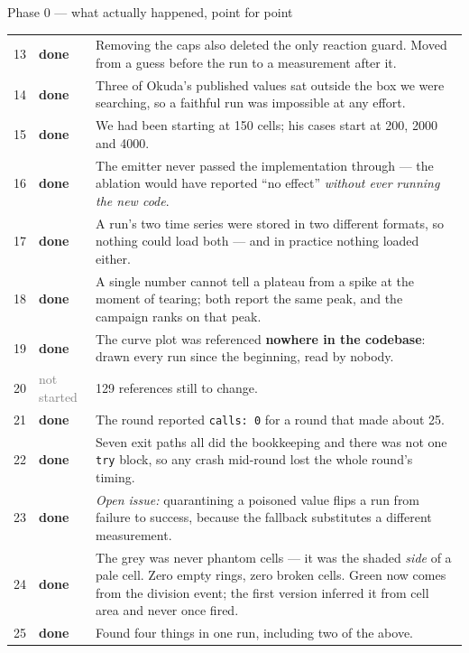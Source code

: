 \documentclass[11pt,a4paper]{article}
\newcommand{\code}[1]{\texttt{#1}}
\newcommand{\dn}{\textcolor{good}{\textbf{done}}}
\newcommand{\ns}{\textcolor{grey}{not started}}
\begin{document}
\begin{phasebox}{Phase 0 --- what actually happened, point for point}
\begin{tabular}{@{}r@{.\ } l p{9.1cm}@{}}
13 & \dn & Removing the caps also deleted the only reaction guard. Moved from a guess before the
          run to a measurement after it.\\
14 & \dn & Three of Okuda's published values sat outside the box we were searching, so a faithful run was impossible at any effort.\\
15 & \dn & We had been starting at 150 cells; his cases start at 200, 2000 and 4000.\\
16 & \dn & The emitter never passed the implementation through --- the ablation would have
          reported ``no effect'' \emph{without ever running the new code}.\\
17 & \dn & A run's two time series were stored in two different formats, so nothing could load both --- and in practice nothing loaded either.\\
18 & \dn & A single number cannot tell a plateau from a spike at the moment of tearing; both report the same peak, and the campaign ranks on that peak.\\
19 & \dn & The curve plot was referenced \textbf{nowhere in the codebase}: drawn every run since
          the beginning, read by nobody.\\
20 & \ns & 129 references still to change.\\
21 & \dn & The round reported \code{calls: 0} for a round that made about 25.\\
22 & \dn & Seven exit paths all did the bookkeeping and there was not one \code{try} block, so any crash mid-round lost the whole round's timing.\\
23 & \dn & \emph{Open issue:} quarantining a poisoned value flips a run from failure to success,
          because the fallback substitutes a different measurement.\\
24 & \dn & The grey was never phantom cells --- it was the shaded \emph{side} of a pale cell. Zero
          empty rings, zero broken cells. Green now comes from the division event; the first
          version inferred it from cell area and never once fired.\\
25 & \dn & Found four things in one run, including two of the above.\\
\bottomrule
\end{tabular}
\end{phasebox}
\end{document}
